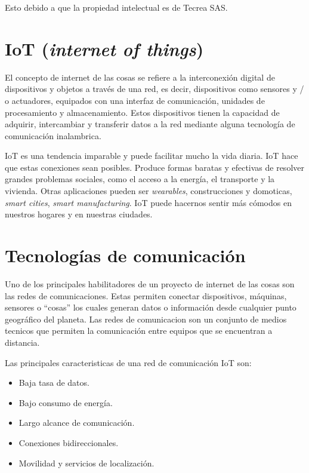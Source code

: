 Esto debido a que la propiedad intelectual es de Tecrea SAS.


\section{IoT (\textit{internet of things})}
El concepto de internet de las cosas se refiere a la interconexión digital de dispositivos y objetos  a través  de una red, es decir, dispositivos como sensores y / o actuadores, equipados con una interfaz de comunicación, unidades de procesamiento y almacenamiento\cite{centenaro2016long}. Estos dispositivos tienen la capacidad de adquirir, intercambiar y transferir datos a la red mediante alguna tecnología de comunicación inalambrica.



IoT es una tendencia imparable y puede facilitar mucho la vida diaria. IoT hace que estas conexiones sean posibles. Produce formas baratas y efectivas de resolver grandes problemas sociales, como el acceso a la energía, el transporte y la vivienda. Otras aplicaciones pueden ser \textit{wearables}, construcciones y domoticas, \textit{smart cities}, \textit{smart manufacturing}\citep{taylor2015world}. IoT puede hacernos sentir más cómodos en nuestros hogares y en nuestras ciudades.

\section{Tecnologías de comunicación}
Uno de los principales habilitadores de un proyecto de internet de las cosas son las redes de comunicaciones. Estas permiten conectar dispositivos, máquinas, sensores o “cosas” los cuales generan datos o información desde cualquier punto geográfico del planeta. Las redes de comunicacion son un conjunto de medios tecnicos que permiten la comunicación entre equipos que se encuentran a distancia.

Las principales caracteristicas de una red de comunicación IoT son:
\begin{itemize}
	\item Baja tasa de datos.
	\item Bajo consumo de energía.
	\item Largo alcance de comunicación.
	\item Conexiones bidireccionales.
	\item Movilidad y servicios de localización.

\end{itemize}

